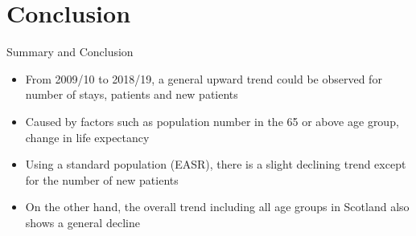 \documentclass[hyperref={breaklinks,colorlinks,
   urlcolor=blue,citecolor=blue,linkcolor=red}]{beamer}
\begin{document}
\iffalse
\section{Gender}
\begin{frame}{Differences by Gender}
\begin{columns}
\begin{column}{0.4\textwidth}
\begin{itemize}
\item{More admissions for male comparing to female}
\item{The ratios fluctuate over the years}
\end{itemize}
\end{column}

\begin{column}{0.7\textwidth}
\begin{figure}
\begin{center}
\texttt{[image: genderdiff]}
\caption{Ratio of male admissions to female admissions.}
\end{center}
\end{figure}
\end{column}
\end{columns}
\end{frame}
\fi

\section{Conclusion}
\begin{frame}{Summary and Conclusion}
\begin{itemize}
\item{From 2009/10 to 2018/19, a general upward trend could be observed for number of stays, patients and new patients}
\item{Caused by factors such as population number in the 65 or above age group, change in life expectancy}
\item{Using a standard population (EASR), there is a slight declining trend except for the number of new patients}
\item{On the other hand, the overall trend including all age groups in Scotland also shows a general decline}
\end{itemize}
\end{frame}






%
%

%




\end{document}
